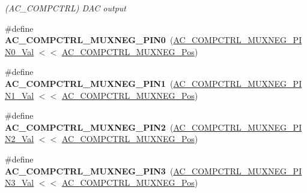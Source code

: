 \begin{DoxyCompactItemize}
\begin{DoxyCompactList}\small\item\em (A\+C\+\_\+\+C\+O\+M\+P\+C\+T\+R\+L) D\+A\+C output \end{DoxyCompactList}\item 
\hypertarget{group___s_a_m_l21___a_c_ga42e949a873b6bf11b60bec30e3c233b5}{}\#define {\bfseries A\+C\+\_\+\+C\+O\+M\+P\+C\+T\+R\+L\+\_\+\+M\+U\+X\+N\+E\+G\+\_\+\+P\+I\+N0}~(\hyperlink{group___s_a_m_l21___a_c_ga6ac9acc365e62893a521696477b34269}{A\+C\+\_\+\+C\+O\+M\+P\+C\+T\+R\+L\+\_\+\+M\+U\+X\+N\+E\+G\+\_\+\+P\+I\+N0\+\_\+\+Val}   $<$$<$ \hyperlink{group___s_a_m_l21___a_c_gae66ccdb1fdce71c5b35d4acf2dcd5234}{A\+C\+\_\+\+C\+O\+M\+P\+C\+T\+R\+L\+\_\+\+M\+U\+X\+N\+E\+G\+\_\+\+Pos})\label{group___s_a_m_l21___a_c_ga42e949a873b6bf11b60bec30e3c233b5}

\item 
\hypertarget{group___s_a_m_l21___a_c_ga0f14ddaf7f348cc16b56e6cd38e216a0}{}\#define {\bfseries A\+C\+\_\+\+C\+O\+M\+P\+C\+T\+R\+L\+\_\+\+M\+U\+X\+N\+E\+G\+\_\+\+P\+I\+N1}~(\hyperlink{group___s_a_m_l21___a_c_ga873c2d1c95b263a318071d6689addd68}{A\+C\+\_\+\+C\+O\+M\+P\+C\+T\+R\+L\+\_\+\+M\+U\+X\+N\+E\+G\+\_\+\+P\+I\+N1\+\_\+\+Val}   $<$$<$ \hyperlink{group___s_a_m_l21___a_c_gae66ccdb1fdce71c5b35d4acf2dcd5234}{A\+C\+\_\+\+C\+O\+M\+P\+C\+T\+R\+L\+\_\+\+M\+U\+X\+N\+E\+G\+\_\+\+Pos})\label{group___s_a_m_l21___a_c_ga0f14ddaf7f348cc16b56e6cd38e216a0}

\item 
\hypertarget{group___s_a_m_l21___a_c_ga8e5072b22d6f2d9d638678bab680daa8}{}\#define {\bfseries A\+C\+\_\+\+C\+O\+M\+P\+C\+T\+R\+L\+\_\+\+M\+U\+X\+N\+E\+G\+\_\+\+P\+I\+N2}~(\hyperlink{group___s_a_m_l21___a_c_gaaf2bd6174b14f8ca4bdd9f20ec55e017}{A\+C\+\_\+\+C\+O\+M\+P\+C\+T\+R\+L\+\_\+\+M\+U\+X\+N\+E\+G\+\_\+\+P\+I\+N2\+\_\+\+Val}   $<$$<$ \hyperlink{group___s_a_m_l21___a_c_gae66ccdb1fdce71c5b35d4acf2dcd5234}{A\+C\+\_\+\+C\+O\+M\+P\+C\+T\+R\+L\+\_\+\+M\+U\+X\+N\+E\+G\+\_\+\+Pos})\label{group___s_a_m_l21___a_c_ga8e5072b22d6f2d9d638678bab680daa8}

\item 
\hypertarget{group___s_a_m_l21___a_c_gadcd780f20458c7d3ec7aba54c9225f52}{}\#define {\bfseries A\+C\+\_\+\+C\+O\+M\+P\+C\+T\+R\+L\+\_\+\+M\+U\+X\+N\+E\+G\+\_\+\+P\+I\+N3}~(\hyperlink{group___s_a_m_l21___a_c_gac9fa005049fffc6404e5517a25ace420}{A\+C\+\_\+\+C\+O\+M\+P\+C\+T\+R\+L\+\_\+\+M\+U\+X\+N\+E\+G\+\_\+\+P\+I\+N3\+\_\+\+Val}   $<$$<$ \hyperlink{group___s_a_m_l21___a_c_gae66ccdb1fdce71c5b35d4acf2dcd5234}{A\+C\+\_\+\+C\+O\+M\+P\+C\+T\+R\+L\+\_\+\+M\+U\+X\+N\+E\+G\+\_\+\+Pos})\label{group___s_a_m_l21___a_c_gadcd780f20458c7d3ec7aba54c9225f52}


\end{DoxyCompactItemize}
